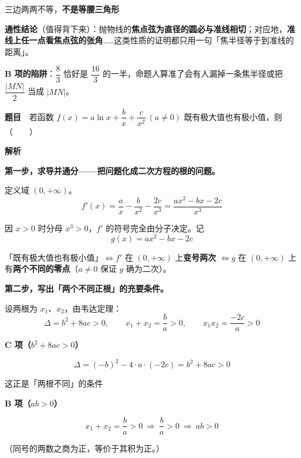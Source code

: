 三边两两不等，\textbf{不是等腰三角形} 

\par\medskip


\begin{gktip}
\textbf{通性结论}（值得背下来）：抛物线的\textbf{焦点弦为直径的圆必与准线相切}；对应地，\textbf{准线上任一点看焦点弦的张角}……这类性质的证明都只用一句「焦半径等于到准线的距离」。

\textbf{B 项的陷阱}：$\dfrac83$ 恰好是 $\dfrac{16}3$ 的一半，命题人算准了会有人漏掉一条焦半径或把 $\dfrac{|MN|}2$ 当成 $|MN|$。
\end{gktip}

\par\medskip


\textbf{题目}　若函数 $f(x)=a\ln x+\dfrac bx+\dfrac c{x^{2}}\ (a\ne0)$ 既有极大值也有极小值，则（　　）

\textbf{解析}

\textbf{第一步，求导并通分——把问题化成二次方程的根的问题。}

定义域 $(0,+\infty)$。
\[f'(x)=\frac ax-\frac b{x^{2}}-\frac{2c}{x^{3}}=\frac{ax^{2}-bx-2c}{x^{3}}\]

因 $x>0$ 时分母 $x^{3}>0$，$f'$ 的符号完全由分子决定。记
\[g(x)=ax^{2}-bx-2c\]

「既有极大值也有极小值」$\iff f'$ 在 $(0,+\infty)$ 上\textbf{变号两次} $\iff g$ 在 $(0,+\infty)$ 上有\textbf{两个不同的零点}（$a\ne0$ 保证 $g$ 确为二次）。

\textbf{第二步，写出「两个不同正根」的充要条件。}

设两根为 $x_1$、$x_2$，由韦达定理：
\[\Delta=b^{2}+8ac>0,\qquad x_1+x_2=\frac ba>0,\qquad x_1x_2=\frac{-2c}a>0\]

\par\medskip

\textbf{C 项（$b^{2}+8ac>0$）}

\[\Delta=(-b)^{2}-4\cdot a\cdot(-2c)=b^{2}+8ac>0\]

这正是「两根不同」的条件 

\par\medskip

\textbf{B 项（$ab>0$）}

\[x_1+x_2=\frac ba>0\ \Longrightarrow\ \frac ba>0\ \Longrightarrow\ ab>0\]

（同号的两数之商为正，等价于其积为正。）

\par\medskip

